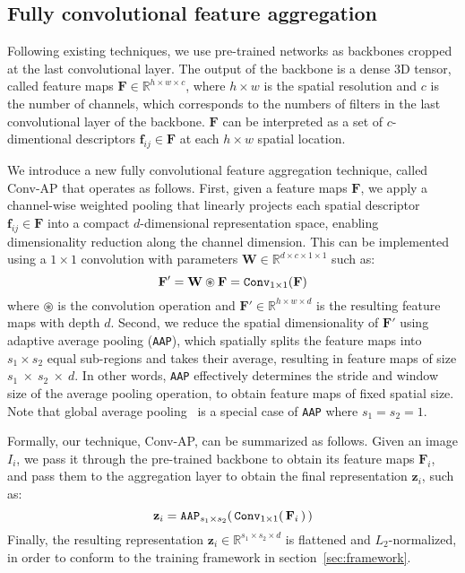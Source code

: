 \documentclass{article}
\begin{document}
\subsection{Fully convolutional feature aggregation}\label{ssec:conv_ap}
Following existing techniques, we use pre-trained networks as backbones cropped at the last convolutional layer.
The output of the backbone is a dense $3$D tensor, called feature maps $\mathbf{F} \in \mathbb{R}^{h \times w \times c}$, where $h {\times} w$ is the spatial resolution and $c$ is the number of channels, which corresponds to the numbers of filters in the last convolutional layer of the backbone. $\mathbf{F}$ can be interpreted as a set of $c$-dimentional descriptors $\mathbf{f}_{ij} \in \mathbf{F}$ at each $h {\times} w$ spatial location.

We introduce a new fully convolutional feature aggregation technique, called Conv-AP that operates as follows. First, given a feature maps $\mathbf{F}$, we apply a channel-wise weighted pooling that linearly projects each spatial descriptor $\mathbf{f}_{ij} \in \mathbf{F}$ into a compact $d$-dimensional representation space, enabling dimensionality reduction along the channel dimension. This can be implemented using a $1 {\times} 1$ convolution with parameters $\mathbf{W} \in \mathbb{R}^{d \times c \times 1 \times 1}$ such as:
\begin{equation}
    \mathbf{F'} = \mathbf{W} \circledast \mathbf{F} = \verb!Conv!_{1 \times 1} (\mathbf{F})
\end{equation}
where $\circledast$ is the convolution operation and $\mathbf{F'} \in \mathbb{R}^{h \times w \times d}$ is the resulting feature maps with depth $d$.
Second, we reduce the spatial dimensionality of $\mathbf{F'}$ using adaptive average pooling (\verb!AAP!), which spatially splits the feature maps into $s_1 {\times} s_2$ equal sub-regions and takes their average, resulting in feature maps of size $s_1~{\times}~s_2~{\times}~d$. In other words, \verb!AAP! effectively determines the stride and window size of the average pooling operation, to obtain feature maps of fixed spatial size. Note that global average pooling~\cite{lin2013network} is a special case of \verb!AAP! where $s_1 = s_2 = 1$. 

Formally, our technique, Conv-AP, can be summarized as follows. Given an image $I_i$, we pass it through the pre-trained backbone to obtain its feature maps $\mathbf{F}_i$, and pass them to the aggregation layer to obtain the final representation $\mathbf{z}_i$, such as:
\begin{equation}
    \mathbf{z}_i =  \verb!AAP!_{s_1 \times s_2} (\, \verb!Conv!_{1 \times 1} (\,\mathbf{F}_i\, ) \,)
\end{equation}
Finally, the resulting representation $\mathbf{z}_i \in \mathbb{R}^{s_1 \times s_2 \times d}$ is flattened and $L_2$-normalized, in order to conform to the training framework in section~\ref{sec:framework}.
\end{document}
